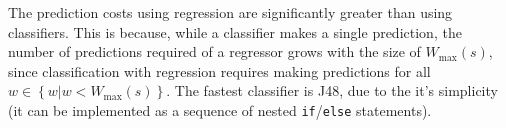 \documentclass[nonatbib,preprint,9pt]{sigplanconf}
\begin{document}



The prediction costs using regression are significantly greater than
using classifiers. This is because, while a classifier makes a single
prediction, the number of predictions required of a regressor grows
with the size of $W_{\max}(s)$, since classification with regression
requires making predictions for all
$w \in \left\{ w | w < W_{\max}(s) \right\}$. The fastest classifier
is J48, due to the it's simplicity (it can be implemented as a
sequence of nested \texttt{if}/\texttt{else} statements).
\end{document}
